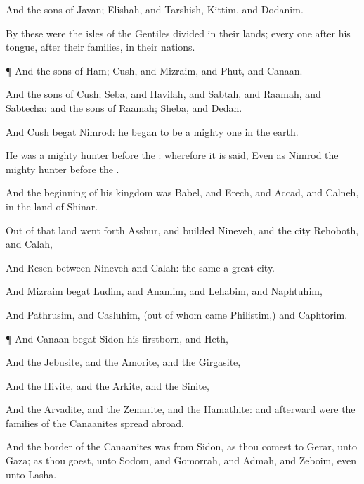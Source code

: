 {And the
sons of
Javan;
Elishah, and
Tarshish,
Kittim, and
Dodanim.

By these were the
isles of the
Gentiles divided
in their
lands; every
one after his
tongue, after their
families, in their
nations.


\par }{\PP {}¶ And the
sons of
Ham;
Cush, and
Mizraim, and
Phut, and
Canaan.

And the
sons of
Cush;
Seba, and
Havilah, and
Sabtah, and
Raamah, and
Sabtecha: and the
sons of
Raamah;
Sheba, and
Dedan.

And
Cush
begat
Nimrod: he
began to
be a mighty
one in the
earth.

He was a
mighty
hunter
before the
{}:
wherefore it is
said, Even as
Nimrod the
mighty
hunter
before the
{}.

And the
beginning of his
kingdom was
Babel, and
Erech, and
Accad, and
Calneh, in the
land of
Shinar.

Out of that
land went
forth
Asshur, and
builded
Nineveh, and the
city
Rehoboth, and
Calah,

And
Resen between
Nineveh and
Calah: the same
{} a
great
city.

And
Mizraim
begat
Ludim, and
Anamim, and
Lehabim, and
Naphtuhim,

And
Pathrusim, and
Casluhim, (out of whom
came
Philistim,) and
Caphtorim.


\par }{\PP {}¶ And
Canaan
begat
Sidon his
firstborn, and
Heth,

And the
Jebusite, and the
Amorite, and the
Girgasite,

And the
Hivite, and the
Arkite, and the
Sinite,

And the
Arvadite, and the
Zemarite, and the
Hamathite: and
afterward were the
families of the
Canaanites spread
abroad.

And the
border of the
Canaanites was from
Sidon, as thou
comest to
Gerar, unto
Gaza; as thou
goest, unto
Sodom, and
Gomorrah, and
Admah, and
Zeboim, even unto
Lasha.

}
